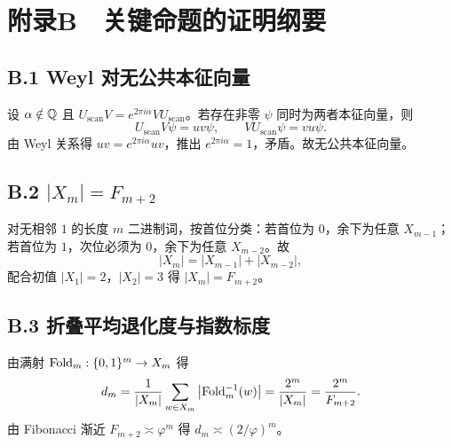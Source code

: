 \section{附录B　关键命题的证明纲要}

\subsection{B.1 Weyl 对无公共本征向量}

设 $\alpha\notin\mathbb{Q}$ 且 $U_{\mathrm{scan}}V=e^{2\pi i\alpha}VU_{\mathrm{scan}}$。若存在非零 $\psi$ 同时为两者本征向量，则
\[
U_{\mathrm{scan}}V\psi=uv\psi,\qquad
VU_{\mathrm{scan}}\psi=vu\psi.
\]
由 Weyl 关系得 $uv=e^{2\pi i\alpha}uv$，推出 $e^{2\pi i\alpha}=1$，矛盾。故无公共本征向量。

\subsection{B.2 \texorpdfstring{$|X_m|=F_{m+2}$}{|X\_m|=F\_{m+2}}}

对无相邻 $1$ 的长度 $m$ 二进制词，按首位分类：若首位为 $0$，余下为任意 $X_{m-1}$；若首位为 $1$，次位必须为 $0$，余下为任意 $X_{m-2}$。故
\[
|X_m|=|X_{m-1}|+|X_{m-2}|,
\]
配合初值 $|X_1|=2$，$|X_2|=3$ 得 $|X_m|=F_{m+2}$。

\subsection{B.3 折叠平均退化度与指数标度}

由满射 $\mathrm{Fold}_m:\{0,1\}^m\to X_m$ 得
\[
d_m=\frac{1}{|X_m|}\sum_{w\in X_m}\big|\mathrm{Fold}_m^{-1}(w)\big|=\frac{2^m}{|X_m|}=\frac{2^m}{F_{m+2}}.
\]
由 Fibonacci 渐近 $F_{m+2}\asymp \varphi^{m}$ 得 $d_m\asymp (2/\varphi)^m$。

